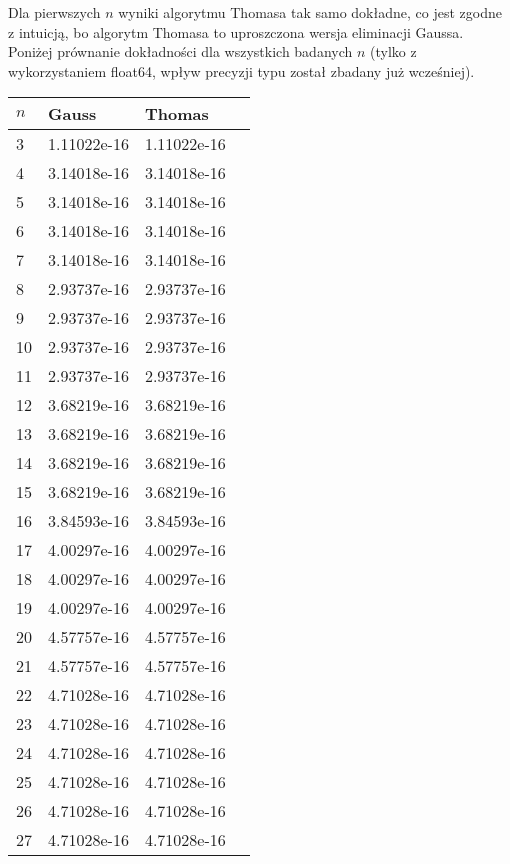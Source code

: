 \documentclass{article}
\begin{document}
Dla pierwszych $n$ wyniki algorytmu Thomasa tak samo dokładne, co jest zgodne z intuicją, bo algorytm Thomasa to uproszczona
wersja eliminacji Gaussa. Poniżej prównanie dokładności dla wszystkich badanych $n$ (tylko z wykorzystaniem float64, wpływ
precyzji typu został zbadany już wcześniej).

\newpage
\thispagestyle{empty}

\begin{table}[H]
\parbox{.45\linewidth}{
\begin{tabular}{|l|l|l|l|}
\hline
$n$ & Gauss & Thomas \\ \hline
3 & 1.11022e-16 & 1.11022e-16 \\ \hline
4 & 3.14018e-16 & 3.14018e-16 \\ \hline
5 & 3.14018e-16 & 3.14018e-16 \\ \hline
6 & 3.14018e-16 & 3.14018e-16 \\ \hline
7 & 3.14018e-16 & 3.14018e-16 \\ \hline
8 & 2.93737e-16 & 2.93737e-16 \\ \hline
9 & 2.93737e-16 & 2.93737e-16 \\ \hline
10 & 2.93737e-16 & 2.93737e-16 \\ \hline
11 & 2.93737e-16 & 2.93737e-16 \\ \hline
12 & 3.68219e-16 & 3.68219e-16 \\ \hline
13 & 3.68219e-16 & 3.68219e-16 \\ \hline
14 & 3.68219e-16 & 3.68219e-16 \\ \hline
15 & 3.68219e-16 & 3.68219e-16 \\ \hline
16 & 3.84593e-16 & 3.84593e-16 \\ \hline
17 & 4.00297e-16 & 4.00297e-16 \\ \hline
18 & 4.00297e-16 & 4.00297e-16 \\ \hline
19 & 4.00297e-16 & 4.00297e-16 \\ \hline
20 & 4.57757e-16 & 4.57757e-16 \\ \hline
21 & 4.57757e-16 & 4.57757e-16 \\ \hline
22 & 4.71028e-16 & 4.71028e-16 \\ \hline
23 & 4.71028e-16 & 4.71028e-16 \\ \hline
24 & 4.71028e-16 & 4.71028e-16 \\ \hline
25 & 4.71028e-16 & 4.71028e-16 \\ \hline
26 & 4.71028e-16 & 4.71028e-16 \\ \hline
27 & 4.71028e-16 & 4.71028e-16 \\ \hline

\end{tabular}}
\end{table}
\end{document}
